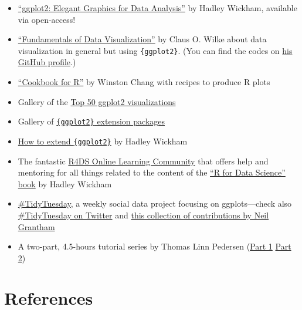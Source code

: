 \documentclass[
  letterpaper,
  DIV=11,
  numbers=noendperiod]{scrreprt}
\providecommand{\tightlist}{%
  \setlength{\itemsep}{0pt}\setlength{\parskip}{0pt}}\usepackage{longtable,booktabs,array}
\newlength{\cslhangindent}
\newenvironment{CSLReferences}[2] %
 {\begin{list}{}{%
  \setlength{\itemindent}{0pt}
  \setlength{\leftmargin}{0pt}
  \setlength{\parsep}{0pt}
  \ifodd #1
   \setlength{\leftmargin}{\cslhangindent}
   \setlength{\itemindent}{-1\cslhangindent}
  \fi
  \setlength{\itemsep}{#2\baselineskip}}}
 {\end{list}}
\begin{document}
\begin{itemize}
\tightlist
\item
  \href{https://ggplot2-book.org/}{``ggplot2: Elegant Graphics for Data
  Analysis''} by Hadley Wickham, available via open-access!
\item
  \href{http://serialmentor.com/dataviz/}{``Fundamentals of Data
  Visualization''} by Claus O. Wilke about data visualization in general
  but using \texttt{\{ggplot2\}}. (You can find the codes on
  \href{https://github.com/clauswilke/dataviz}{his GitHub profile}.)
\item
  \href{http://www.cookbook-r.com/Graphs/}{``Cookbook for R''} by
  Winston Chang with recipes to produce R plots
\item
  Gallery of the
  \href{http://r-statistics.co/Top50-Ggplot2-Visualizations-MasterList-R-Code.html}{Top
  50 ggplot2 visualizations}
\item
  Gallery of
  \href{https://exts.ggplot2.tidyverse.org/gallery/}{\texttt{\{ggplot2\}}
  extension packages}
\item
  \href{https://cran.r-project.org/web/packages/ggplot2/vignettes/extending-ggplot2.html}{How
  to extend \texttt{\{ggplot2\}}} by Hadley Wickham
\item
  The fantastic \href{https://www.rfordatasci.com/}{R4DS Online Learning
  Community} that offers help and mentoring for all things related to
  the content of the \href{r4ds.had.co.nz/}{``R for Data Science'' book}
  by Hadley Wickham
\item
  \href{https://github.com/rfordatascience/tidytuesday}{\#TidyTuesday},
  a weekly social data project focusing on ggplots---check also
  \href{https://twitter.com/hashtag/TidyTuesday?lang=en}{\#TidyTuesday
  on Twitter} and \href{https://nsgrantham.com/tidytuesdayrocks/}{this
  collection of contributions by Neil Grantham}
\item
  A two-part, 4.5-hours tutorial series by Thomas Linn Pedersen
  (\href{https://www.youtube.com/watch?v=h29g21z0a68}{Part 1} \textbar{}
  \href{https://www.youtube.com/watch?v=0m4yywqNPVY}{Part 2})
\end{itemize}


\chapter*{References}\label{references}


\label{refs}
\begin{CSLReferences}{0}{1}
\end{CSLReferences}
\end{document}
